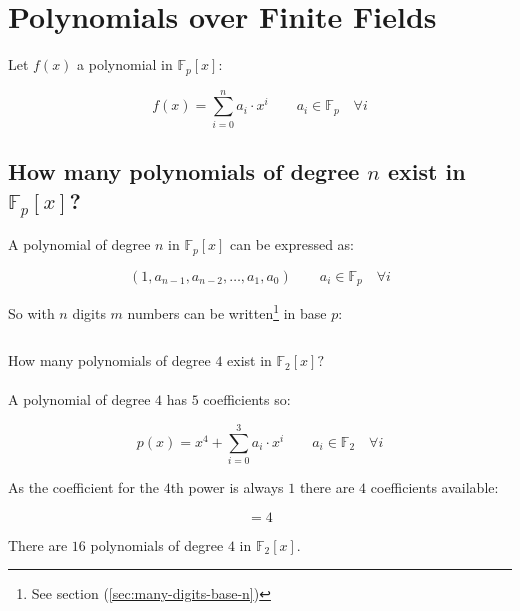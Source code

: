 %

\chapter{Polynomials over Finite Fields}

Let $f(x)$ a polynomial in $\mathbb{F}_p[x]$:

\begin{displaymath}
 f(x) = \sum_{i=0}^n a_i \cdot x^i \qquad a_i \in \mathbb{F}_p \quad \forall i
\end{displaymath}

\section{How many polynomials of degree $n$ exist in $\mathbb{F}_p[x]$?}

A polynomial of degree $n$ in $\mathbb{F}_p[x]$ can be expressed as:

\begin{displaymath}
(1, a_{n-1}, a_{n-2}, \dots, a_1,a_0) \qquad a_i \in \mathbb{F}_p \quad \forall i
\end{displaymath}

So with $n$ digits $m$ numbers can be written\footnote{See section (\ref{sec:many-digits-base-n})} in base $p$:

\begin{displaymath}
[\log_{p} (m) = n]
\end{displaymath}

\begin{example}
How many polynomials of degree $4$ exist in $\mathbb{F}_2[x]?$
\ \\ \\
%
A polynomial of degree $4$ has $5$ coefficients so:

\begin{displaymath}
p(x) = x^4 + \sum_{i=0}^{3} a_i \cdot x^i \qquad a_i \in \mathbb{F}_2 \quad \forall i
\end{displaymath}

As the coefficient for the $4$th power is always $1$ there are $4$ coefficients available:

\begin{displaymath}
[\log_2 (16)] = 4
\end{displaymath}

There are $16$ polynomials of degree $4$ in $\mathbb{F}_2[x]$.
\end{example}

